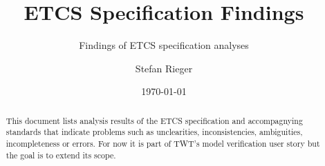 \documentclass{template/openetcs_article}
\begin{document}
\frontmatter
{}






\title{ETCS Specification Findings}

\subtitle{Findings of ETCS specification analyses}

\date{\today}


\author{Stefan Rieger}







\begin{abstract}
  This document lists analysis results of the ETCS specification and accompagnying standards that indicate problems such as unclearities, inconsistencies, ambiguities, incompleteness or errors. For now it is part of TWT's model verification user story but the goal is to extend its scope.
\end{abstract}

\newcommand{\issue}[1]{\refstepcounter{issuecounter}\textbf{Issue \#\arabic{issuecounter} (#1):}}	

\newcommand{\resolution}{\textit{Resolution: }}	

\maketitle
\end{document}
